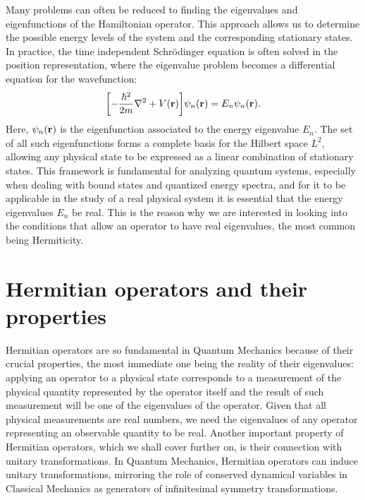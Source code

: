             Many problems can often be reduced to finding the eigenvalues and eigenfunctions of the Hamiltonian operator. This approach allows us to determine the possible energy levels of the system and the corresponding stationary states. In practice, the time independent Schr\"odinger equation is often solved in the position representation, where the eigenvalue problem becomes a differential equation for the wavefunction:
            \begin{equation}
                \label{eq:schrodinger-position}
                \bqty{-\frac{\hbar^2}{2m}\laplacian + V\pqty{\vb{r}}}\psi_n(\vb{r}) = E_n\psi_n(\vb{r})
                \myperiod
            \end{equation}
            Here, $\psi_n\pqty{\vb{r}}$ is the eigenfunction associated to the energy eigenvalue $E_n$. The set of all such eigenfunctions forms a complete basis for the Hilbert space $L^2$, allowing any physical state to be expressed as a linear combination of stationary states. This framework is fundamental for analyzing quantum systems, especially when dealing with bound states and quantized energy spectra, and for it to be applicable in the study of a real physical system it is essential that the energy eigenvalues $E_n$ be real. This is the reason why we are interested in looking into the conditions that allow an operator to have real eigenvalues, the most common being Hermiticity.

    \section{Hermitian operators and their properties}\label{s:hermitian-operators}
        Hermitian operators are so fundamental in Quantum Mechanics because of their crucial properties, the most immediate one being the reality of their eigenvalues: applying an operator to a physical state corresponds to a measurement of the physical quantity represented by the operator itself and the result of such measurement will be one of the eigenvalues of the operator. Given that all physical measurements are real numbers, we need the eigenvalues of any operator representing an observable quantity to be real. Another important property of Hermitian operators, which we shall cover further on, is their connection with unitary transformations. In Quantum Mechanics, Hermitian operators can induce unitary transformations, mirroring the role of conserved dynamical variables in Classical Mechanics as generators of infinitesimal symmetry transformations.
        

